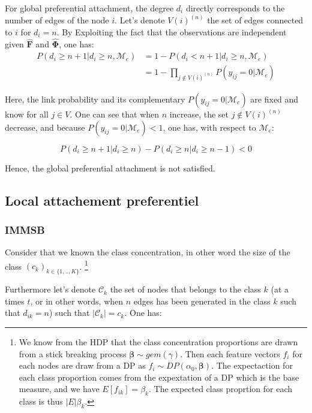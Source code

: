 \documentclass{article}
\newcommand{\me}{\mathcal{M}_e}
\begin{document}
For global preferential attachment, the degree $d_i$ directly corresponds to the number of edges of the node $i$. Let's denote $V(i)^{(n)}$ the set of edges connected to $i$ for $d_i = n$. By Exploiting the fact that the observations are independent given $\bm{\hat{F}}$ and $\bm{\hat{\Phi}}$, one has:
%
\begin{align*}
    P(d_i \geq n+1 | d_i \geq n,  \mathcal{M}_e) &= 1 - P(d_i < n+1 | d_i \geq n, \mathcal{M}_e) \\
                                 &= 1 - \prod_{j\notin V(i)^{(n)}} P(y_{ij}=0 | \mathcal{M}_e)
\end{align*}


Here, the link probability and its complementary $P(y_{ij}=0 | \mathcal{M}_e)$ are fixed and know for all $j\in V$. One can see that when $n$ increase, the set $j\notin V(i)^{(n)}$ decrease, and because  $P(y_{ij}=0 | \mathcal{M}_e) < 1$, one has, with respect to $\me$: 

\begin{equation*}
    P(d_i \geq n+1 | d_i \geq n) -  P(d_i \geq n | d_i \geq n-1) < 0
\end{equation*}

Hence, the global preferential attachment is not satisfied.

\subsection{Local attachement preferentiel}

\subsubsection{IMMSB}

Consider that we known the class concentration, in other word the size of the class $(c_k)_{k\in \{1,..,K\}}$. \footnote{We know from the HDP that the class concentration proportions are drawn from a stick breaking process $\bm{\beta} \sim gem(\gamma)$. Then each feature vectors $f_i$ for each nodes are draw from a DP as $f_i \sim DP(\alpha_0, \bm{\beta})$. The expectaction for each class proportion comes from the expextation of a DP which is the base measure, and we have  $E[f_{ik}] = \beta_k$. The expected class proprtion for each class is thus $|E| \beta_k$.}

\newcommand{\C}{\mathcal{C}}

Furthermore let's denote $\C_k$ the set of nodes that belongs to the class $k$ (at a  times $t$, or in other words, when $n$ edges has been generated in the class $k$ such that $d_{ik}=n$)  such that $|\C_k|=c_k$. One has:
\end{document}
